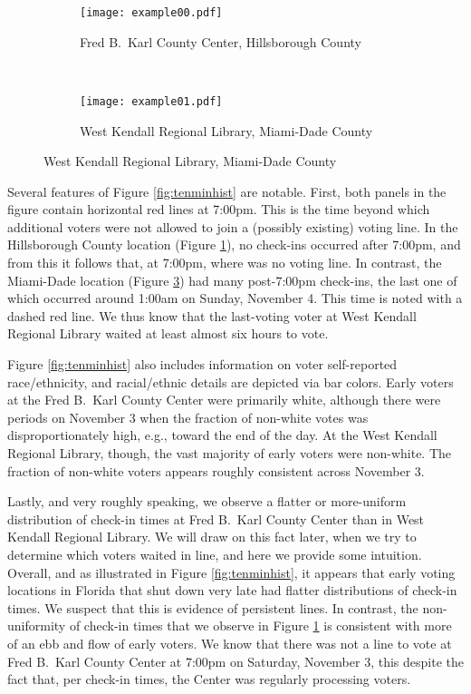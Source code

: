 \documentclass[12pt,titlepage]{article}
\begin{document}
\begin{figure}[!ht]
  \caption{Early voting check-in times on Saturday, November 3, 2012, in two Florida locations}
  \label{fig:tenminhist}
  \centering
  \begin{subfigure}[b]{\linewidth}
    \centering\texttt{[image: example00.pdf]}
    \caption{Fred B.\ Karl County Center, Hillsborough County}
    \label{fig:karlexample}
  \end{subfigure}%
  \\
  \begin{subfigure}[b]{\linewidth}
    \centering\texttt{[image: example01.pdf]}
    \caption{West Kendall Regional Library, Miami-Dade County}
    \label{fig:kendallexample}
  \end{subfigure}
\end{figure}

Several features of Figure \ref{fig:tenminhist} are notable.  First,
both panels in the figure contain horizontal red lines at 7:00pm.
This is the time beyond which additional voters were not allowed to
join a (possibly existing) voting line.  In the Hillsborough County
location (Figure \ref{fig:karlexample}), no check-ins occurred after
7:00pm, and from this it follows that, at 7:00pm, where was no voting
line.  In contrast, the Miami-Dade location (Figure
\ref{fig:kendallexample}) had many post-7:00pm check-ins, the last one
of which occurred around 1:00am on Sunday, November 4.  This time is
noted with a dashed red line.  We thus know that the last-voting voter
at West Kendall Regional Library waited at least almost six hours to
vote.

Figure \ref{fig:tenminhist} also includes information on voter
self-reported race/ethnicity, and racial/ethnic details are depicted via bar colors.
Early voters at the Fred B.\ Karl County Center were primarily white,
although there were periods on November 3 when the fraction of
non-white votes was disproportionately high, e.g., toward the end of
the day.  At the West Kendall Regional Library, though, the vast
majority of early voters were non-white.  The fraction of non-white
voters appears roughly consistent across November 3.

Lastly, and very roughly speaking, we observe a flatter or
more-uniform distribution of check-in times at Fred B.\ Karl County
Center than in West Kendall Regional Library.  We will draw on this
fact later, when we try to determine which voters waited in line, and
here we provide some intuition.  Overall, and as illustrated in Figure
\ref{fig:tenminhist}, it appears that early voting locations in
Florida that shut down very late had flatter distributions of check-in
times.  We suspect that this is evidence of persistent lines.  In
contrast, the non-uniformity of check-in times that we observe in
Figure \ref{fig:karlexample} is consistent with more of an ebb and
flow of early voters.  We know that there was not a line to vote at
Fred B.\ Karl County Center at 7:00pm on Saturday, November 3, this
despite the fact that, per check-in times, the Center was regularly
processing voters.
\end{document}
